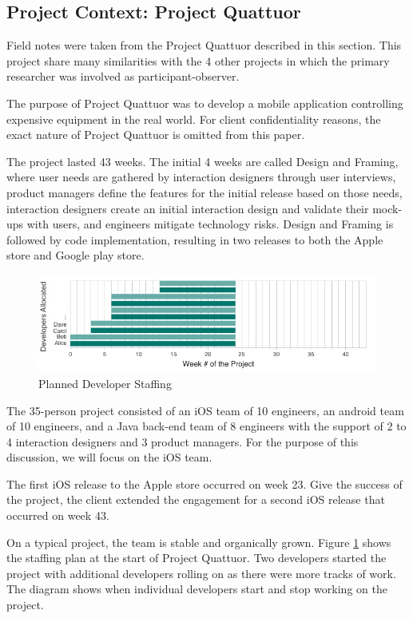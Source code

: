 \subsection{Project Context: Project Quattuor}
Field notes were taken from the Project Quattuor described in this section. This project share many similarities with the 4 other projects in which the primary researcher was involved as participant-observer.

\label{ExampleInAction}
The purpose of Project Quattuor was to develop a mobile application controlling expensive equipment in the real world. For client confidentiality reasons, the exact nature of Project Quattuor is omitted from this paper. 

The project lasted 43 weeks. The initial 4 weeks are called Design and Framing, where user needs are gathered by interaction designers through user interviews, product managers define the features for the initial release based on those needs, interaction designers create an initial interaction design and validate their mock-ups with users, and engineers mitigate technology risks. Design and Framing is followed by code implementation, resulting in two releases to both the Apple store and Google play store.


\begin{figure}[t]
\centering
\includegraphics[width=7.1in]{OriginalDeveloperStaffingV2.jpg}
\caption{Planned Developer Staffing}
\label{PlannedDeveloperStaffing}
\end{figure}

The 35-person project consisted of an iOS team of 10 engineers, an android team of 10 engineers, and a Java back-end team of 8 engineers with the support of 2 to 4 interaction designers and 3 product managers. For the purpose of this discussion, we will focus on the iOS team. 

The first iOS release to the Apple store occurred on week 23. Give the success of the project, the client extended the engagement for a second iOS release that occurred on week 43. 

On a typical project, the team is stable and organically grown. Figure \ref{PlannedDeveloperStaffing} shows the staffing plan at the start of Project Quattuor. Two developers started the project with additional developers rolling on as there were more tracks of work. The diagram shows when individual developers start and stop working on the project. 

